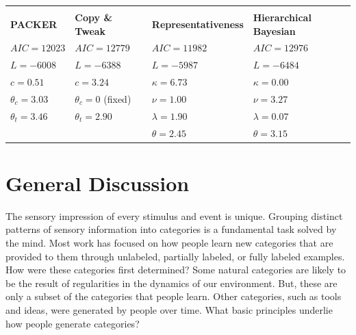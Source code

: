 \documentclass[12pt]{article}
\begin{document}
\begin{flushleft}
\begin{table}
\begin{tabular}{ l l l l} \\ \\ \textbf{PACKER} & \textbf{Copy \& Tweak} &
\textbf{Representativeness} & \textbf{Hierarchical Bayesian} \\ 
  \hline $AIC = 12023$ &$AIC = 12779$ &$AIC = 11982$  &$AIC = 12976$\\ 
  $L = -6008$          &$L = -6388$   &$L = -5987$    &$L = -6484$\\ 
  $c = 0.51$           &$c = 3.24$    &$\kappa = 6.73$&$\kappa = 0.00$  \\ 
  $\theta_c = 3.03$    &$\theta_c = 0$ (fixed)  &$\nu = 1.00$ &$\nu = 3.27$\\
  $\theta_t = 3.46$    &$\theta_t = 2.90$       &$\lambda = 1.90$ &$\lambda = 0.07$\\
                       &              &$\theta = 2.45$ &$\theta = 3.15$\\
\end{tabular}
\end{table}



%

\section{General Discussion}
The sensory impression of every stimulus and event is unique. Grouping distinct
patterns of sensory information into categories is a fundamental task solved by
the mind. Most work has focused on how people learn new categories that are
provided to them through unlabeled, partially labeled, or fully labeled
examples. How were these categories first determined? Some natural categories
are likely to be the result of regularities in the dynamics of our environment.
But, these are only a subset of the categories that people learn. Other
categories, such as tools and ideas, were generated by people over time. What
basic principles underlie how people generate categories?


\end{flushleft}
\end{document}
